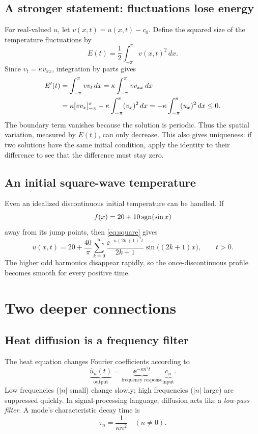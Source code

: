 \subsection{A stronger statement: fluctuations lose energy}
For real-valued $u$, let $v(x,t)=u(x,t)-c_0$. Define the squared size of the
temperature fluctuations by
\[
 E(t)=\frac12\int_{-\pi}^{\pi}v(x,t)^2\,dx.
\]
Since $v_t=\kappa v_{xx}$, integration by parts gives
\begin{align}\label{eq:energy}
 E'(t)
 &=\int_{-\pi}^{\pi}v v_t\,dx
 =\kappa\int_{-\pi}^{\pi}v v_{xx}\,dx\notag\\
 &=\kappa[vv_x]_{-\pi}^{\pi}
 -\kappa\int_{-\pi}^{\pi}(v_x)^2\,dx
 =-\kappa\int_{-\pi}^{\pi}(u_x)^2\,dx\leq0.
\end{align}
The boundary term vanishes because the solution is periodic. Thus the spatial
variation, measured by $E(t)$, can only decrease. This also gives uniqueness:
if two solutions have the same initial condition, apply the identity to their
difference to see that the difference must stay zero.

\subsection{An initial square-wave temperature}
\begin{example}
Even an idealized discontinuous initial temperature can be handled. If
\[
 f(x)=20+10\operatorname{sgn}(\sin x)
\]
away from its jump points, then \cref{eq:square} gives
\begin{equation}\label{eq:square-heat}
 u(x,t)=20+\frac{40}{\pi}\sum_{k=0}^{\infty}
 \frac{\ee^{-\kappa(2k+1)^2t}}{2k+1}
 \sin\bigl((2k+1)x\bigr),\qquad t>0.
\end{equation}
The higher odd harmonics disappear rapidly, so the once-discontinuous profile
becomes smooth for every positive time.
\end{example}

\section{Two deeper connections}
\subsection{Heat diffusion is a frequency filter}
The heat equation changes Fourier coefficients according to
\[
 \underbrace{\widehat{u}_n(t)}_{\text{output}}
 =\underbrace{\ee^{-\kappa n^2t}}_{\text{frequency response}}
 \underbrace{c_n}_{\text{input}}.
\]
Low frequencies ($|n|$ small) change slowly; high frequencies ($|n|$ large)
are suppressed quickly. In signal-processing language, diffusion acts like a
\emph{low-pass filter}. A mode's characteristic decay time is
\[
 \tau_n=\frac{1}{\kappa n^2}\quad(n\neq0).
\]

